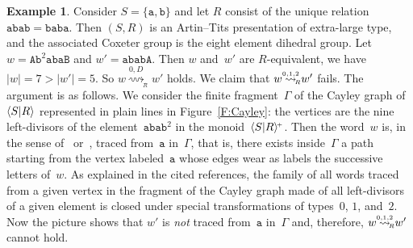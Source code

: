 \documentclass{amsart}
\numberwithin{equation}{section}
\theoremstyle{plain}
\theoremstyle{definition}
\newtheorem{exam}[prop]{Example}
\begin{document}
\begin{exam}
\label{X:Conterex}
Consider ${S} = \{{\mathtt{a}}, {\mathtt{b}}\}$ and let ${R}$ consist of the unique relation ${\mathtt{a}} {\mathtt{b}} {\mathtt{a}} {\mathtt{b}} = {\mathtt{b}} {\mathtt{a}} {\mathtt{b}} {\mathtt{a}}$. Then $({S}, {R})$ is an Artin--Tits presentation of extra-large type, and the associated Coxeter group is the eight element dihedral group. Let ${w} = {\mathtt{A}} {\mathtt{b}}^2 {\mathtt{a}} {\mathtt{b}} {\mathtt{a}} {\mathtt{B}}$ and ${w}' = {\mathtt{a}} {\mathtt{b}} {\mathtt{a}} {\mathtt{b}} {\mathtt{A}}$. Then ${w}$ and~${w}'$ are ${R}$-equivalent, we have ${\vert{w}\vert} = 7 > {\vert{{w}'}\vert} = 5$. So ${w} {\mathrel{{\mathrel{\overset{\scriptscriptstyle 0,D}{\rightsquigarrow}}}_{\widehat{{\!{}_{R}}}}}} {w}'$ holds. We claim that ${w} {\mathrel{{\mathrel{\overset{\scriptscriptstyle 0,1,2}{\rightsquigarrow}}}_{\hspace{-0.9ex}{\scriptscriptstyle R}}}} {w}'$ fails. The argument is as follows. We consider the finite fragment~$\Gamma$ of the Cayley graph of~${\langle{S}{\mid}\nobreak{R}\rangle}$ represented in plain lines in Figure~\ref{F:Cayley}: the vertices are the nine left-divisors of the element~${\mathtt{a}} {\mathtt{b}} {\mathtt{a}} {\mathtt{b}}^2$ in the monoid~${\langle{S}{\mid}\nobreak{R}\rangle^{\!\scriptscriptstyle+}}$. Then the word~${w}$ is, in the sense of~\cite{Dfo} or~\cite[Chapter~IV]{Dhr}, traced from~${\mathtt{a}}$ in~$\Gamma$, that is, there exists inside~$\Gamma$ a path starting from the vertex labeled~${\mathtt{a}}$ whose edges wear as labels the successive letters of~${w}$. As explained in the cited references, the family of all words traced from a given vertex in the fragment of the Cayley graph made of all left-divisors of a given element is closed under special transformations of types~$0$, $1$, and~$2$. Now the picture shows that ${w}'$ is \emph{not} traced from~${\mathtt{a}}$ in~$\Gamma$ and, therefore, ${w} {\mathrel{{\mathrel{\overset{\scriptscriptstyle 0,1,2}{\rightsquigarrow}}}_{\hspace{-0.9ex}{\scriptscriptstyle R}}}} {w}'$ cannot hold.
\end{exam}
\end{document}

